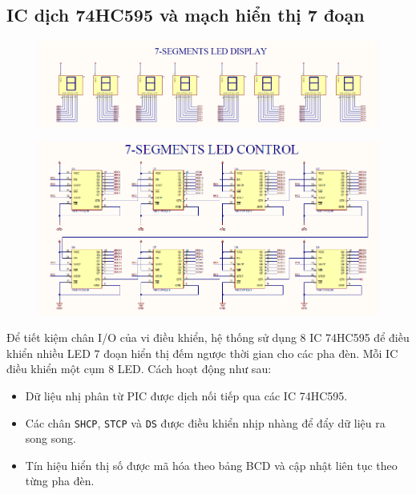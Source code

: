 \subsection{IC dịch 74HC595 và mạch hiển thị 7 đoạn}
\begin{figure}[H]
    \centering
    \includegraphics[width=1\textwidth]{pictures/7seg1.png}
\end{figure}
\begin{figure}[H]
    \centering
    \includegraphics[width=1\textwidth]{pictures/7seg2.png}
\end{figure}
Để tiết kiệm chân I/O của vi điều khiển, hệ thống sử dụng 8 IC 74HC595 để điều khiển nhiều LED 7 đoạn hiển thị đếm ngược thời gian cho các pha đèn. Mỗi IC điều khiển một cụm 8 LED. Cách hoạt động như sau:
\begin{itemize}
    \item Dữ liệu nhị phân từ PIC được dịch nối tiếp qua các IC 74HC595.
    \item Các chân \texttt{SHCP}, \texttt{STCP} và \texttt{DS} được điều khiển nhịp nhàng để đẩy dữ liệu ra song song.
    \item Tín hiệu hiển thị số được mã hóa theo bảng BCD và cập nhật liên tục theo từng pha đèn.
\end{itemize}

